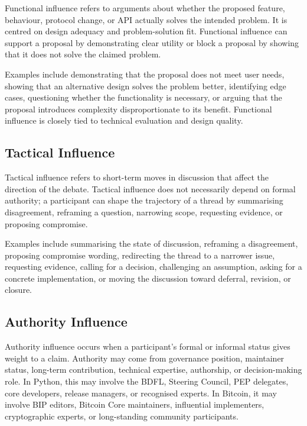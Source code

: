 \documentclass[sigconf,screen]{acmart}
\begin{document}
Functional influence refers to arguments about whether the proposed feature, behaviour, protocol change, or API actually solves the intended problem. It is centred on design adequacy and problem-solution fit. Functional influence can support a proposal by demonstrating clear utility or block a proposal by showing that it does not solve the claimed problem.

Examples include demonstrating that the proposal does not meet user needs, showing that an alternative design solves the problem better, identifying edge cases, questioning whether the functionality is necessary, or arguing that the proposal introduces complexity disproportionate to its benefit. Functional influence is closely tied to technical evaluation and design quality.

\subsection{Tactical Influence}

Tactical influence refers to short-term moves in discussion that affect the direction of the debate. Tactical influence does not necessarily depend on formal authority; a participant can shape the trajectory of a thread by summarising disagreement, reframing a question, narrowing scope, requesting evidence, or proposing compromise.

Examples include summarising the state of discussion, reframing a disagreement, proposing compromise wording, redirecting the thread to a narrower issue, requesting evidence, calling for a decision, challenging an assumption, asking for a concrete implementation, or moving the discussion toward deferral, revision, or closure.

\subsection{Authority Influence}

Authority influence occurs when a participant's formal or informal status gives weight to a claim. Authority may come from governance position, maintainer status, long-term contribution, technical expertise, authorship, or decision-making role. In Python, this may involve the BDFL, Steering Council, PEP delegates, core developers, release managers, or recognised experts. In Bitcoin, it may involve BIP editors, Bitcoin Core maintainers, influential implementers, cryptographic experts, or long-standing community participants.
\end{document}
